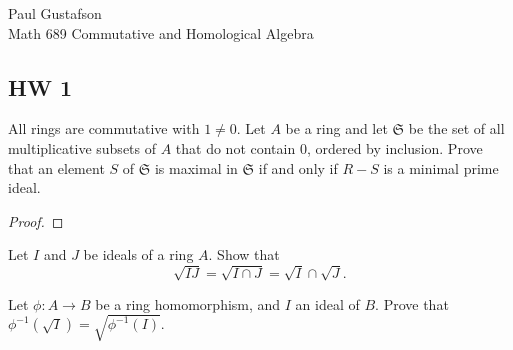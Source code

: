 \documentclass{article}
\begin{document}
\noindent Paul Gustafson\\
\noindent Math 689 Commutative and Homological Algebra

\subsection*{HW 1}
All rings are commutative with $1 \neq 0$.
 Let $A$ be a ring and let $\mathfrak S$ be the set of all multiplicative subsets of $A$ that do not contain $0$, ordered by inclusion.  Prove that an element $S$ of $\mathfrak S$ is maximal in $\mathfrak S$ if and only if $R - S$ is a minimal prime ideal.
\begin{proof}
\end{proof}

 Let $I$ and $J$ be ideals of a ring $A$. Show that 
$$\sqrt{IJ} = \sqrt{ I \cap J }   = \sqrt I \cap \sqrt J .$$

 Let $\phi: A \to B$ be a ring homomorphism, and $I$ an ideal of $B$. Prove that $\phi^{-1}(\sqrt I) = \sqrt{\phi^{-1}(I)}$.
\end{document}
